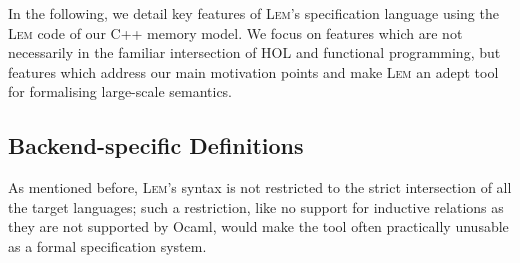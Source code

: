 \documentclass[a4paper]{llncs}
\newcommand{\myparagraph}[1]{\vspace{0.5\baselineskip}\par\noindent{\normalsize\bfseries{#1}}\quad}
\newcommand{\Lem}{\textsc{Lem}}
\begin{document}
%
%
%
%
%

In the following, we detail key features of \Lem's specification language using
the \Lem{} code of our C++ memory model. We focus on features which are not
necessarily in the familiar intersection of HOL and functional programming, but
features which address our main motivation points and make \Lem{} an adept tool
for formalising large-scale semantics.

\subsection{Backend-specific Definitions}
%
As mentioned before, \Lem's syntax is not restricted to the strict intersection
of all the target languages; such a restriction, like no support for inductive
relations as they are not supported by Ocaml, would make the tool often
practically unusable as a formal specification system.
\end{document}

